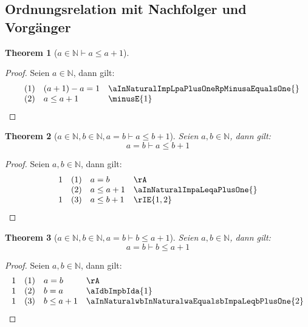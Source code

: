 \documentclass{book}
\theoremstyle{plain}
\newtheorem{theorem}{Theorem}
\theoremstyle{remark}
\theoremstyle{definition}
\begin{document}
\subsection{Ordnungsrelation mit Nachfolger und Vorgänger}

\label{aInNaturalImpaLeqaPlusOne}
\begin{theorem}[\(a\in\mathbb{N}\vdash a\leq a+1\)]
\end{theorem}
\begin{proof}
    Seien \(a\in\mathbb{N}\), dann gilt:
        \[
	\begin{array}{llll}
                &  (1) & (a+1)-a=1 & \aInNaturalImpLpaPlusOneRpMinusaEqualsOne{} \\
                &  (2) & a\leq a+1 & \minusE{1} \\
    \end{array}
	\]
\end{proof}

\label{aInNaturalwbInNaturalwaEqualsbImpaLeqbPlusOne}
\begin{theorem}[\(a\in\mathbb{N},b\in\mathbb{N},a=b\vdash a\leq b+1\)]
Seien \(a,b\in\mathbb{N}\), dann gilt:
\[a=b\vdash a\leq b+1\]
\end{theorem}
\begin{proof}
    Seien \(a,b\in\mathbb{N}\), dann gilt:
        \[
	\begin{array}{llll}
            1   &  (1) & a=b & \rA \\
                &  (2) & a\leq a+1 & \aInNaturalImpaLeqaPlusOne{} \\
            1   &  (3) &  a\leq b+1 & \rIE{1,2} \\
    \end{array}
	\]
\end{proof}

\label{aInNaturalwbInNaturalwaEqualsbImpbLeqaPlusOne}
\begin{theorem}[\(a\in\mathbb{N},b\in\mathbb{N},a=b\vdash b\leq a+1\)]
Seien \(a,b\in\mathbb{N}\), dann gilt:
\[a=b\vdash b\leq a+1\]
\end{theorem}
\begin{proof}
    Seien \(a,b\in\mathbb{N}\), dann gilt:
        \[
	\begin{array}{llll}
            1   &  (1) & a=b & \rA \\
            1   &  (2) & b=a & \aIdbImpbIda{1} \\
            1   &  (3) & b\leq a+1 & \aInNaturalwbInNaturalwaEqualsbImpaLeqbPlusOne{2} \\
    \end{array}
	\]
\end{proof}
\end{document}
